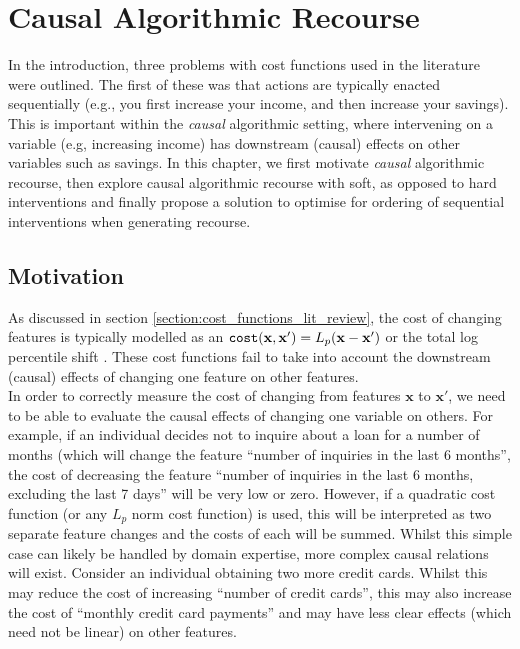 \chapter{Causal Algorithmic Recourse} \label{chapter:causal_recourse}

In the introduction, three problems with cost functions used in the literature were outlined. The first of these was that actions are typically enacted sequentially (e.g., you first increase your income, and then increase your savings). This is important within the \textit{causal} algorithmic setting, where intervening on a variable (e.g, increasing income) has downstream (causal) effects on other variables such as savings. In this chapter, we first motivate \textit{causal} algorithmic recourse, then explore causal algorithmic recourse with soft, as opposed to hard interventions and finally propose a solution to optimise for ordering of sequential interventions when generating recourse.

\section{Motivation}

As discussed in section \ref{section:cost_functions_lit_review}, the cost of changing features is typically modelled as an $\operatorname*{\texttt{cost}}(\mathbf{x,x}')=L_p(\mathbf{x} - \mathbf{x}')$ or the total log percentile shift \citep{ustunActionableRecourseLinear2019}. These cost functions fail to take into account the downstream (causal) effects of changing one feature on other features.\\

In order to correctly measure the cost of changing from features $\mathbf{x}$ to $\mathbf{x}'$, we need to be able to evaluate the causal effects of changing one variable on others. For example, if an individual decides not to inquire about a loan for a number of months (which will change the feature ``number of inquiries in the last 6 months'', the cost of decreasing the feature ``number of inquiries in the last 6 months, excluding the last 7 days'' will be very low or zero. However, if a quadratic cost function (or any $L_p$ norm cost function) is used, this will be interpreted as two separate feature changes and the costs of each will be summed. Whilst this simple case can likely be handled by domain expertise, more complex causal relations will exist. Consider an individual obtaining two more credit cards. Whilst this may reduce the cost of increasing ``number of credit cards'', this may also increase the cost of ``monthly credit card payments'' and may have less clear effects (which need not be linear) on other features.\\

